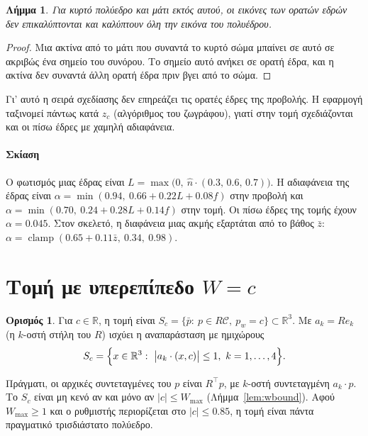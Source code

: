 \documentclass[10pt,a4paper]{article}
\theoremstyle{plain}
\newtheorem{lemma}[theorem]{Λήμμα}
\theoremstyle{definition}
\newtheorem{definition}[theorem]{Ορισμός}
\newcommand{\R}{\mathbb{R}}
\newcommand{\C}{\mathcal{C}}
\begin{document}
\begin{lemma}
Για κυρτό πολύεδρο και μάτι εκτός αυτού, οι εικόνες των ορατών εδρών δεν επικαλύπτονται και καλύπτουν όλη την εικόνα του πολυέδρου.
\end{lemma}
\begin{proof}
Μια ακτίνα από το μάτι που συναντά το κυρτό σώμα μπαίνει σε αυτό σε ακριβώς ένα σημείο του συνόρου. Το σημείο αυτό ανήκει σε ορατή έδρα, και η ακτίνα δεν συναντά άλλη ορατή έδρα πριν βγει από το σώμα.
\end{proof}
Γι' αυτό η σειρά σχεδίασης δεν επηρεάζει τις ορατές έδρες της προβολής. Η εφαρμογή ταξινομεί πάντως κατά $z_c$ (αλγόριθμος του ζωγράφου), γιατί στην τομή σχεδιάζονται και οι πίσω έδρες με χαμηλή αδιαφάνεια.

\paragraph{Σκίαση} Ο φωτισμός μιας έδρας είναι $L=\max\bigl(0,\ \hat n\cdot(0.3,\,0.6,\,0.7)\bigr)$. Η αδιαφάνεια της έδρας είναι $\alpha=\min(0.94,\ 0.66+0.22L+0.08f)$ στην προβολή και $\alpha=\min(0.70,\ 0.24+0.28L+0.14f)$ στην τομή. Οι πίσω έδρες της τομής έχουν $\alpha=0.045$. Στον σκελετό, η διαφάνεια μιας ακμής εξαρτάται από το βάθος $\bar z$: $\alpha=\operatorname{clamp}(0.65+0.11\bar z,\ 0.34,\ 0.98)$.

\section{Τομή με υπερεπίπεδο \texorpdfstring{$W=c$}{W=c}}\label{sec:slice}
\begin{definition}
Για $c\in\R$, η τομή είναι $S_c=\{\bar p:\ p\in R\C,\ p_w=c\}\subset\R^3$. Με $a_k=Re_k$ (η $k$-οστή στήλη του $R$) ισχύει η αναπαράσταση με ημιχώρους
\[
S_c=\Bigl\{x\in\R^3:\ \bigl|a_k\cdot(x,c)\bigr|\le1,\ k=1,\dots,4\Bigr\}.
\]
\end{definition}
Πράγματι, οι αρχικές συντεταγμένες του $p$ είναι $R^\top p$, με $k$-οστή συντεταγμένη $a_k\cdot p$. Το $S_c$ είναι μη κενό αν και μόνο αν $|c|\le W_{\max}$ (Λήμμα~\ref{lem:wbound}). Αφού $W_{\max}\ge1$ και ο ρυθμιστής περιορίζεται στο $|c|\le0.85$, η τομή είναι πάντα πραγματικό τρισδιάστατο πολύεδρο.
\end{document}
